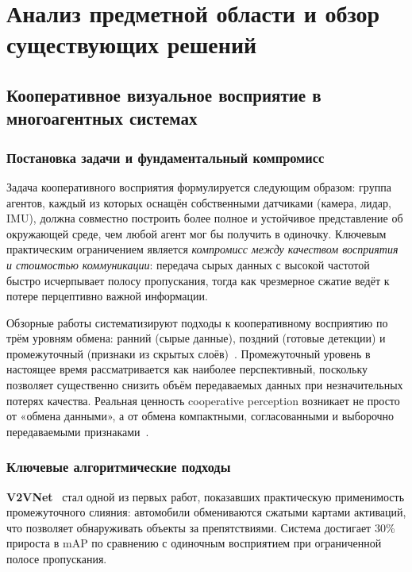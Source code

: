 \documentclass[14pt,a4paper]{extreport}
\begin{document}
\chapter{Анализ предметной области и обзор существующих решений}

\section{Кооперативное визуальное восприятие в многоагентных системах}

\subsection{Постановка задачи и фундаментальный компромисс}

Задача кооперативного восприятия формулируется следующим образом: группа агентов, каждый из которых оснащён собственными датчиками (камера, лидар, IMU), должна совместно построить более полное и устойчивое представление об окружающей среде, чем любой агент мог бы получить в одиночку. Ключевым практическим ограничением является \textit{компромисс между качеством восприятия и стоимостью коммуникации}: передача сырых данных с высокой частотой быстро исчерпывает полосу пропускания, тогда как чрезмерное сжатие ведёт к потере перцептивно важной информации.

Обзорные работы систематизируют подходы к кооперативному восприятию по трём уровням обмена: ранний (сырые данные), поздний (готовые детекции) и промежуточный (признаки из скрытых слоёв)~\cite{han2023,liu2023v2x}. Промежуточный уровень в настоящее время рассматривается как наиболее перспективный, поскольку позволяет существенно снизить объём передаваемых данных при незначительных потерях качества. Реальная ценность cooperative perception возникает не просто от «обмена данными», а от обмена компактными, согласованными и выборочно передаваемыми признаками~\cite{liu2023v2x}.

\subsection{Ключевые алгоритмические подходы}

\textbf{V2VNet}~\cite{wang2020v2vnet} стал одной из первых работ, показавших практическую применимость промежуточного слияния: автомобили обмениваются сжатыми картами активаций, что позволяет обнаруживать объекты за препятствиями. Система достигает 30\% прироста в mAP по сравнению с одиночным восприятием при ограниченной полосе пропускания.
\end{document}

